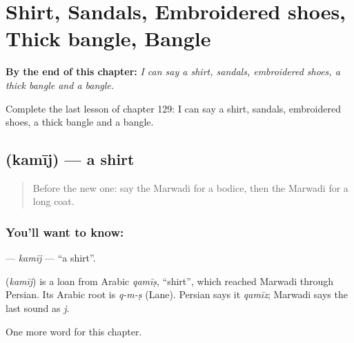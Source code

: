
\chapter{Shirt, Sandals, Embroidered shoes, Thick bangle, Bangle}
\label{ch:mw-shirt-sandals-embroidered-shoes-thick-bangle-bangle}

\begin{chapteropening}
\textbf{By the end of this chapter:} \emph{I can say a shirt, sandals, embroidered shoes, a thick bangle and a bangle.}

Complete the last lesson of chapter 129: I can say a shirt, sandals, embroidered shoes, a thick bangle and a bangle.
\end{chapteropening}

\section[\texorpdfstring{\mw{कमीज} (kamīj)}{कमीज (kamīj)}]{ (kamīj) — a shirt}

\label{lesson:MW-C129-kamij}



\begin{quote}
Before the new one: say the Marwadi for a bodice, then the Marwadi for a long coat.
\end{quote}

\subsection*{You'll want to know: }
\textbf{} — \emph{kamīj} — \textquotedblleft{}a shirt\textquotedblright{}.

\begin{cousinweb}
\textbf{} (\emph{kamīj}) is a loan from Arabic \emph{qamīṣ}, \textquotedblleft{}shirt\textquotedblright{}, which reached Marwadi through Persian. Its Arabic root is \emph{q-m-ṣ} (Lane). Persian says it \emph{qamīz}; Marwadi says the last sound as \emph{j}.
\end{cousinweb}

\begin{grammarlens}[title={What you've built}]
One more word for this chapter.
\end{grammarlens}

